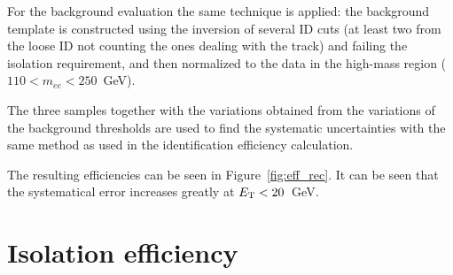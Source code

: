 For the background evaluation the same technique is applied: the background template is constructed using the inversion of several ID cuts (at least two from the loose ID not counting the ones dealing with the track) and failing the isolation requirement, and then normalized to the data in the high-mass region ($110 < m_{ee} < 250$~GeV).

The three samples together with the variations obtained from the variations of the background thresholds are used to find the systematic uncertainties with the same method as used in the identification efficiency calculation.

The resulting efficiencies can be seen in Figure~\ref{fig:eff_rec}. It can be seen that the systematical error increases greatly at $E_{\mathrm{T}} < 20$~GeV.

\begin{figure}
\end{figure}

\section{Isolation efficiency}

